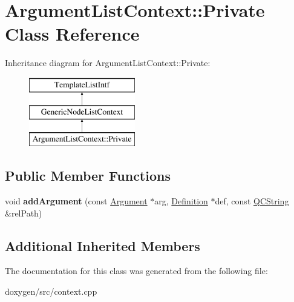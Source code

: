 \hypertarget{class_argument_list_context_1_1_private}{}\section{Argument\+List\+Context\+::Private Class Reference}
\label{class_argument_list_context_1_1_private}
Inheritance diagram for Argument\+List\+Context\+::Private\+:\begin{figure}[H]
\begin{center}
\leavevmode
\includegraphics[height=3.000000cm]{class_argument_list_context_1_1_private}
\end{center}
\end{figure}
\subsection*{Public Member Functions}
\begin{DoxyCompactItemize}
\item 
\mbox{\label{class_argument_list_context_1_1_private_a9803ebec4d1da1ff91b055e668d593db}} 
void {\bfseries add\+Argument} (const \mbox{\hyperlink{struct_argument}{Argument}} $\ast$arg, \mbox{\hyperlink{class_definition}{Definition}} $\ast$def, const \mbox{\hyperlink{class_q_c_string}{Q\+C\+String}} \&rel\+Path)
\end{DoxyCompactItemize}
\subsection*{Additional Inherited Members}


The documentation for this class was generated from the following file\+:\begin{DoxyCompactItemize}
\item 
doxygen/src/context.\+cpp\end{DoxyCompactItemize}
